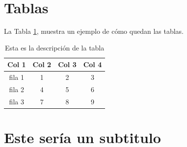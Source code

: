 \section{Tablas}
La Tabla \ref{refdelatabla}, muestra un ejemplo de cómo quedan las tablas.

\begin{table}[!ht]
    \vspace{\baselineskip}
    \caption{Esta es la descripción de la tabla}
    \label{refdelatabla}
    \centering
    \begin{tabular}{cccc}
        \hline
        \hline
        Col 1   & Col 2 & Col 3 &  Col 4\\
        \hline
        fila 1  & 1     & 2     & 3\\
        fila 2  & 4     & 5     & 6\\
        fila 3  & 7     & 8     & 9\\
        \hline
        \hline
    \end{tabular}
\end{table}



\section{Este sería un subtitulo}
%
\lipsum[3-4]

